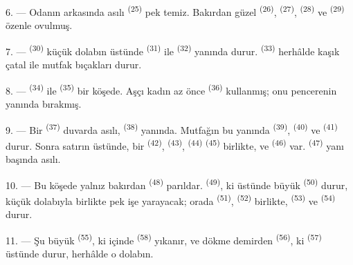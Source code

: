 \VUsaut{4.0mm}
\VUsaut{3.0mm}

6. --- Odanın arkasında asılı  \textsuperscript{(25)}
pek temiz. Bakırdan güzel  \textsuperscript{(26)},
 \textsuperscript{(27)}, 
\textsuperscript{(28)} ve  \textsuperscript{(29)} özenle
ovulmuş.

7. ---  \textsuperscript{(30)} küçük dolabın üstünde
 \textsuperscript{(31)} ile 
\textsuperscript{(32)} yanında durur. 
\textsuperscript{(33)} herhâlde kaşık çatal ile mutfak bıçakları durur.

8. ---  \textsuperscript{(34)} ile 
\textsuperscript{(35)} bir köşede. Aşçı kadın az önce 
\textsuperscript{(36)} kullanmış; onu pencerenin yanında bırakmış.

9. --- Bir  \textsuperscript{(37)} duvarda asılı,
 \textsuperscript{(38)} yanında. Mutfağın bu yanında
 \textsuperscript{(39)}, 
\textsuperscript{(40)} ve  \textsuperscript{(41)} durur.
Sonra satırın üstünde, bir  \textsuperscript{(42)},
 \textsuperscript{(43)}, 
\textsuperscript{(44)}  \textsuperscript{(45)} birlikte, ve
 \textsuperscript{(46)} var. 
\textsuperscript{(47)} yanı başında asılı.

10. --- Bu köşede yalnız bakırdan  \textsuperscript{(48)}
parıldar.  \textsuperscript{(49)}, ki üstünde büyük
 \textsuperscript{(50)} durur, küçük dolabıyla birlikte pek işe
yarayacak; orada  \textsuperscript{(51)},
 \textsuperscript{(52)} birlikte, 
\textsuperscript{(53)} ve  \textsuperscript{(54)} durur.

\VUsaut{4.0mm}
\VUsaut{3.0mm}

11. --- Şu büyük  \textsuperscript{(55)}, ki içinde
 \textsuperscript{(58)} yıkanır, ve dökme demirden
 \textsuperscript{(56)}, ki 
\textsuperscript{(57)} üstünde durur, herhâlde o dolabın.

